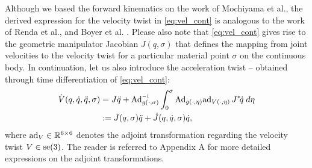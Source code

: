 {\begin{equation}
\end{equation}
%
Although we based the forward kinematics on the work of Mochiyama et al.\cite{Mochiyama2003}, the derived expression for the velocity twist in \eqref{eq:vel_cont} is analogous to the work of Renda et al.\cite{Renda2018,Renda2020}, and Boyer et al. \cite{Boyer2010,Boyer2021}. Please also note that \eqref{eq:vel_cont} gives rise to the geometric manipulator Jacobian $J(q,\sigma)
$ that defines the mapping from joint velocities to the velocity twist for a particular material point $\sigma$ on the continuous body. In continuation, let us also introduce the acceleration twist\cite{Boyer2021,Mochiyama2003,Renda2018} -- obtained through time differentiation of \eqref{eq:vel_cont}:
%
\begin{align}
\dot{V}(q,\dot{q},\ddot{q},\sigma) & = J \ddot{q} + \Ad_{g(\cdot,\sigma)} \inv \int_0^\sigma \Ad_{g(\cdot,\eta)}
\ad_{V(\cdot,\eta)} \, J^*\! \dot{q}\;d\eta \notag \\
& := J(q,\sigma)\ddot{q} + \dot{J}(q,\dot{q},\sigma) \dot{q},
\label{eq:acceleration}
\end{align}
%
where $\text{ad}_{V} \in \mathbb{R}^{6\times 6}$ denotes the adjoint transformation regarding the velocity twist $V \in {\text{se}(3)}$. The reader is referred to Appendix A for more detailed expressions on the adjoint transformations.
%
}
